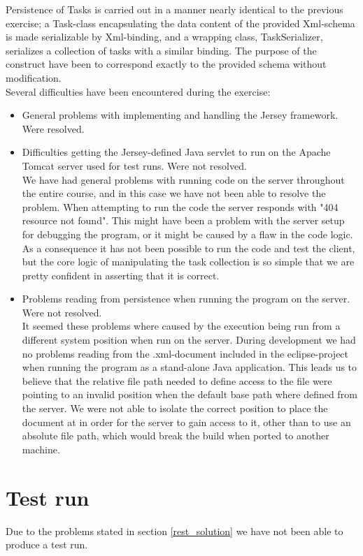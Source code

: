 Persistence of Tasks is carried out in a manner nearly identical to the previous exercise; a Task-class encapsulating the data content of the provided Xml-schema is made serializable by Xml-binding, and a wrapping class, TaskSerializer, serializes a collection of tasks with a similar binding. The purpose of the construct have been to correspond exactly to the provided schema without modification.\\

Several difficulties have been encountered during the exercise:
\begin{itemize}
	\item General problems with implementing and handling the Jersey framework. Were resolved.
	\item Difficulties getting the Jersey-defined Java servlet to run on the Apache Tomcat server used for test runs. Were not resolved.\\
	We have had general problems with running code on the server throughout the entire course, and in this case we have not been able to resolve the problem. When attempting to run the code the server responds with "404 resource not found". This might have been a problem with the server setup for debugging the program, or it might be caused by a flaw in the code logic. As a consequence it has not been possible to run the code and test the client, but the core logic of manipulating the task collection is so simple that we are pretty confident in asserting that it is correct.
	\item Problems reading from persistence when running the program on the server. Were not resolved.\\
	It seemed these problems where caused by the execution being run from a different system position when run on the server. During development we had no problems reading from the .xml-document included in the eclipse-project when running the program as a stand-alone Java application. This leads us to believe that the relative file path needed to define access to the file were pointing to an invalid position when the default base path where defined from the server. We were not able to isolate the correct position to place the document at in order for the server to gain access to it, other than to use an absolute file path, which would break the build when ported to another machine.
\end{itemize}
\section{Test run}
\label{rest_test}
	Due to the problems stated in section \ref{rest_solution} we have not been able to produce a test run.
